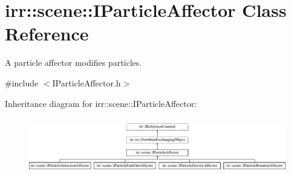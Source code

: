 \hypertarget{classirr_1_1scene_1_1IParticleAffector}{}\section{irr\+:\+:scene\+:\+:I\+Particle\+Affector Class Reference}
\label{classirr_1_1scene_1_1IParticleAffector}


A particle affector modifies particles.  




{\ttfamily \#include $<$I\+Particle\+Affector.\+h$>$}

Inheritance diagram for irr\+:\+:scene\+:\+:I\+Particle\+Affector\+:\begin{figure}[H]
\begin{center}
\leavevmode
\includegraphics[height=2.488889cm]{classirr_1_1scene_1_1IParticleAffector}
\end{center}
\end{figure}
